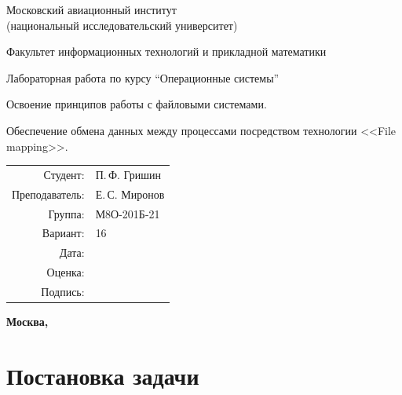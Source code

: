 \documentclass[pdf, unicode, 12pt, a4paper,oneside,fleqn]{article}
\begin{document}
\begin{titlepage}
    \begin{center}
        \bfseries

        {\Large Московский авиационный институт\\ (национальный исследовательский университет)}
        
        \vspace{48pt}
        
        {\large Факультет информационных технологий и прикладной математики}
        
        \vspace{48pt}
        
        Лабораторная работа  по курсу \enquote{Операционные системы}

        \vspace{48pt}

        Освоение принципов работы с файловыми системами. 
        
        Обеспечение обмена данных между процессами посредством технологии <<File mapping>>.
    \end{center}
    
    \vspace{140pt}
    
    \begin{flushright}
    \begin{tabular}{rl}
    Студент: & П.\,Ф. Гришин \\
    Преподаватель: & Е.\,С. Миронов \\
    Группа: & М8О-201Б-21 \\
    Вариант: & 16 \\
    Дата: & \\
    Оценка: & \\
    Подпись: & \\
    \end{tabular}
    \end{flushright}
    
    \vfill
    
    \begin{center}
    \bfseries
    Москва, \the\year
    \end{center}
\end{titlepage}
    
\pagebreak

\section{Постановка задачи}
\end{document}

